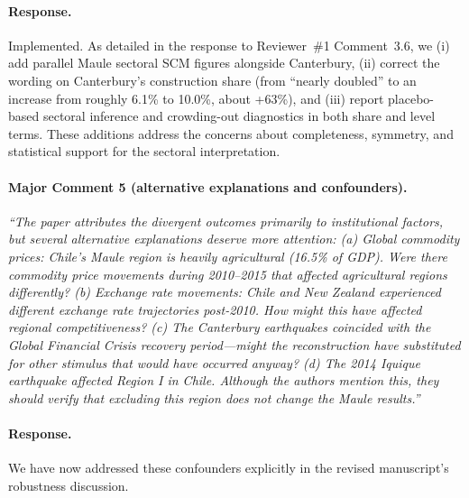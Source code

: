 \paragraph{Response.}
Implemented. As detailed in the response to Reviewer~\#1 Comment~3.6, we (i) add parallel Maule sectoral SCM figures alongside Canterbury, (ii) correct the wording on Canterbury's construction share (from ``nearly doubled'' to an increase from roughly 6.1\% to 10.0\%, about +63\%), and (iii) report placebo-based sectoral inference and crowding-out diagnostics in both share and level terms. These additions address the concerns about completeness, symmetry, and statistical support for the sectoral interpretation.

\paragraph{Major Comment 5 (alternative explanations and confounders).}
\textit{``The paper attributes the divergent outcomes primarily to institutional factors, but several alternative explanations deserve more attention: (a) Global commodity prices: Chile's Maule region is heavily agricultural (16.5\% of GDP). Were there commodity price movements during 2010--2015 that affected agricultural regions differently? (b) Exchange rate movements: Chile and New Zealand experienced different exchange rate trajectories post-2010. How might this have affected regional competitiveness? (c) The Canterbury earthquakes coincided with the Global Financial Crisis recovery period---might the reconstruction have substituted for other stimulus that would have occurred anyway? (d) The 2014 Iquique earthquake affected Region I in Chile. Although the authors mention this, they should verify that excluding this region does not change the Maule results.''}

\paragraph{Response.}
We have now addressed these confounders explicitly in the revised manuscript's robustness discussion.

